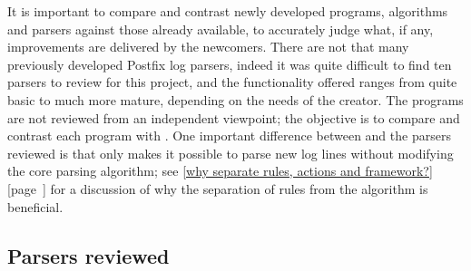 \documentclass[a4paper,12pt,draft]{article}
\newcommand{\parsername}{\PLP{}}
\newcommand{\refwithpage}[1]{%
    \empty{}\ref{#1} [page~\pageref{#1}]%
}
\newcommand{\sectionref}[1]{%
    \textsection{}\refwithpage{#1}%
}
\begin{document}
It is important to compare and contrast newly developed programs,
algorithms and parsers against those already available, to accurately judge
what, if any, improvements are delivered by the newcomers.  There are not
that many previously developed Postfix log parsers, indeed it was quite
difficult to find ten parsers to review for this project, and the
functionality offered ranges from quite basic to much more mature,
depending on the needs of the creator.  The programs are not reviewed from
an independent viewpoint; the objective is to compare and contrast each
program with \parsername{}.  One important difference between \parsername{}
and the parsers reviewed is that only \parsername{} makes it possible to
parse new log lines without modifying the core parsing algorithm; see
\sectionref{why separate rules, actions and framework?} for a discussion of
why the separation of rules from the algorithm is beneficial.


\subsection{Parsers reviewed}
\end{document}

